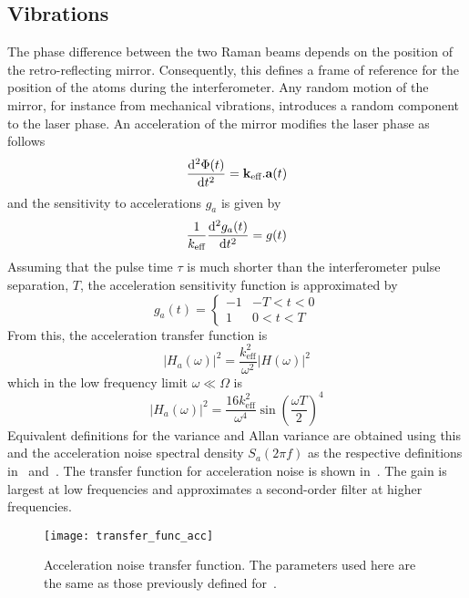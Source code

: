 \subsection{Vibrations}\label{subsec:vibration_noise}
The phase difference between the two Raman beams depends on the
position of the retro-reflecting mirror. Consequently, this defines a frame of
reference for the position of the atoms during the interferometer. Any
random motion of the mirror, for instance from mechanical vibrations,
introduces a random component to the laser phase. An acceleration of
the mirror modifies the laser phase as follows
\begin{equation}
  \frac{\mathrm{d}^2 \Phi(t)}{\mathrm{d} t^2} = {\textbf k_\textnormal{eff}}.\textbf{a}(t)
  \label{eq:phase_acc}
\end{equation}
and the sensitivity to accelerations \(g_a\) is given by
\begin{equation}
  \frac{1}{k_\text{eff}} \frac{\mathrm{d}^2 g_a(t)}{\mathrm{d} t^2} =
  g(t) \\
  \label{eq:acc_sens}
\end{equation}
Assuming that the pulse time \(\tau\) is much shorter than the
interferometer pulse separation, \(T\), the acceleration sensitivity
function is approximated by
\begin{equation}
  g_a(t) = \begin{cases}
 -1 & - T < t < 0\\
 1 & 0 < t < T
  \end{cases}
  \label{eq:acc_sens_approx}
\end{equation}
From this, the acceleration transfer function is
\begin{equation}
  |H_a(\omega)|^2 = \frac{k_\text{eff}^2}{\omega^2}|H(\omega)|^2 
  \label{eq:acc_transfer}
\end{equation}
which in the low frequency limit \(\omega \ll \Omega\) is
\begin{equation}
  |H_a(\omega)|^2 = \frac{16 k_\text{eff}^2}{\omega^4}
  \sin\left(\frac{\omega T}{2}\right)^4
  \label{eq:acc_tf_low}
\end{equation}
Equivalent definitions for the variance and Allan variance are
obtained using this and the acceleration noise spectral density
\(S_a(2\pi f)\) as the respective definitions
in~
and~. The transfer function for
acceleration noise is shown in~. The
gain is largest at low frequencies and approximates a second-order
filter at higher frequencies.
\begin{figure}[htpb]
  \centering
  \texttt{[image: transfer\_func\_acc]}
  \caption[Acceleration noise transfer function.]{Acceleration noise
  transfer function. The parameters used here are the same as those
previously defined for~.}
  \label{fig:transfer_func_acc}
\end{figure}
